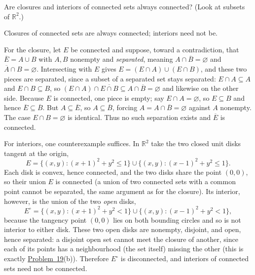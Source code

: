 \documentclass[main.tex]{subfiles}
\begin{document}
Are closures and interiors of connected sets always connected? (Look at subsets of $\mathbb R^2$.)

\begin{SolutionBlue}
Closures of connected sets are always connected; interiors need not be.

For the closure, let $E$ be connected and suppose, toward a contradiction, that $\overline E=A\cup B$
with $A,B$ nonempty and \emph{separated}, meaning $A\cap\overline B=\varnothing$ and
$\overline A\cap B=\varnothing$. Intersecting with $E$ gives $E=(E\cap A)\cup(E\cap B)$, and these two
pieces are separated, since a subset of a separated set stays separated: $E\cap A\subseteq A$ and
$E\cap B\subseteq B$, so $(E\cap A)\cap\overline{E\cap B}\subseteq A\cap\overline B=\varnothing$ and
likewise on the other side. Because $E$ is connected, one piece is empty; say $E\cap A=\varnothing$,
so $E\subseteq B$ and hence $\overline E\subseteq\overline B$. But $A\subseteq\overline E$, so
$A\subseteq\overline B$, forcing $A=A\cap\overline B=\varnothing$ against $A$ nonempty. The case
$E\cap B=\varnothing$ is identical. Thus no such separation exists and $\overline E$ is connected.

For interiors, one counterexample suffices. In $\mathbb R^2$ take the two closed unit disks tangent at
the origin,
\[
  E=\{(x,y):(x+1)^2+y^2\le 1\}\cup\{(x,y):(x-1)^2+y^2\le 1\}.
\]
Each disk is convex, hence connected, and the two disks share the point $(0,0)$, so their union $E$ is
connected (a union of two connected sets with a common point cannot be separated, the same argument as
for the closure). Its interior, however, is the union of the two \emph{open} disks,
\[
  E^{\circ}=\{(x,y):(x+1)^2+y^2< 1\}\cup\{(x,y):(x-1)^2+y^2< 1\},
\]
because the tangency point $(0,0)$ lies on both bounding circles and so is not interior to either disk.
These two open disks are nonempty, disjoint, and open, hence separated: a disjoint open set cannot meet
the closure of another, since each of its points has a neighbourhood (the set itself) missing the other
(this is exactly \hyperlink{prob:19}{Problem~19}(b)). Therefore $E^{\circ}$ is disconnected, and
interiors of connected sets need not be connected.
\end{SolutionBlue}
\end{document}
